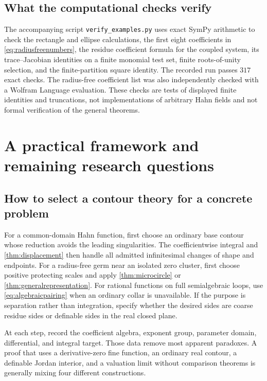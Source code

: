\documentclass[11pt,letterpaper]{article}
\theoremstyle{definition}
\theoremstyle{remark}
\numberwithin{equation}{section}
\begin{document}
\subsection{What the computational checks verify}
The accompanying script \texttt{verify\_examples.py} uses exact SymPy arithmetic to check the rectangle and ellipse calculations, the first eight coefficients in \eqref{eq:radiusfreenumbers}, the residue coefficient formula for the coupled system, its trace--Jacobian identities on a finite monomial test set, finite roots-of-unity selection, and the finite-partition square identity. The recorded run passes $317$ exact checks. The radius-free coefficient list was also independently checked with a Wolfram Language evaluation. These checks are tests of displayed finite identities and truncations, not implementations of arbitrary Hahn fields and not formal verification of the general theorems.

\section{A practical framework and remaining research questions}\label{sec:outlook}

\subsection{How to select a contour theory for a concrete problem}
For a common-domain Hahn function, first choose an ordinary base contour whose reduction avoids the leading singularities. The coefficientwise integral and \cref{thm:displacement} then handle all admitted infinitesimal changes of shape and endpoints. For a radius-free germ near an isolated zero cluster, first choose positive protecting scales and apply \cref{thm:microcircle} or \cref{thm:generalrepresentation}. For rational functions on full semialgebraic loops, use \eqref{eq:algebraicpairing} when an ordinary collar is unavailable. If the purpose is separation rather than integration, specify whether the desired sides are coarse residue sides or definable sides in the real closed plane.

At each step, record the coefficient algebra, exponent group, parameter domain, differential, and integral target. Those data remove most apparent paradoxes. A proof that uses a derivative-zero fine function, an ordinary real contour, a definable Jordan interior, and a valuation limit without comparison theorems is generally mixing four different constructions.
\end{document}
